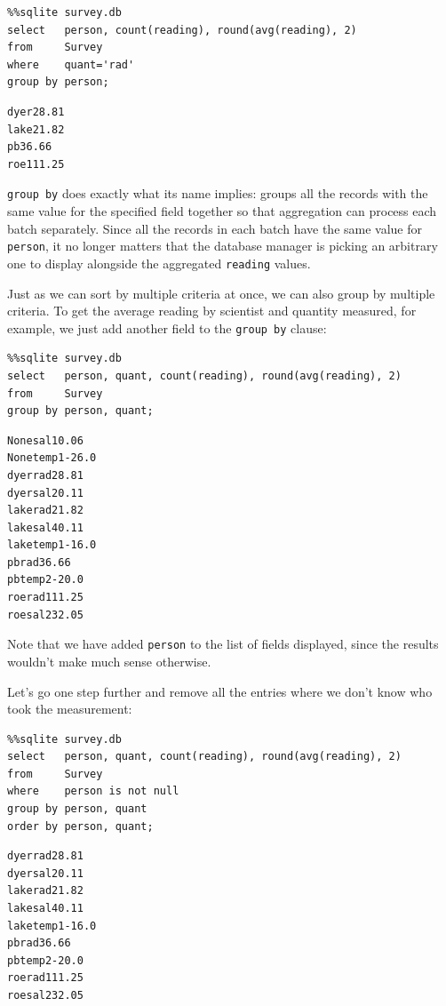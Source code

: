 \documentclass[]{book}
\begin{document}
\begin{verbatim}
%%sqlite survey.db
select   person, count(reading), round(avg(reading), 2)
from     Survey
where    quant='rad'
group by person;
\end{verbatim}

\begin{verbatim}
dyer28.81
lake21.82
pb36.66
roe111.25
\end{verbatim}

\texttt{group by} does exactly what its name implies: groups all the
records with the same value for the specified field together so that
aggregation can process each batch separately. Since all the records in
each batch have the same value for \texttt{person}, it no longer matters
that the database manager is picking an arbitrary one to display
alongside the aggregated \texttt{reading} values.

Just as we can sort by multiple criteria at once, we can also group by
multiple criteria. To get the average reading by scientist and quantity
measured, for example, we just add another field to the
\texttt{group by} clause:

\begin{verbatim}
%%sqlite survey.db
select   person, quant, count(reading), round(avg(reading), 2)
from     Survey
group by person, quant;
\end{verbatim}

\begin{verbatim}
Nonesal10.06
Nonetemp1-26.0
dyerrad28.81
dyersal20.11
lakerad21.82
lakesal40.11
laketemp1-16.0
pbrad36.66
pbtemp2-20.0
roerad111.25
roesal232.05
\end{verbatim}

Note that we have added \texttt{person} to the list of fields displayed,
since the results wouldn't make much sense otherwise.

Let's go one step further and remove all the entries where we don't know
who took the measurement:

\begin{verbatim}
%%sqlite survey.db
select   person, quant, count(reading), round(avg(reading), 2)
from     Survey
where    person is not null
group by person, quant
order by person, quant;
\end{verbatim}

\begin{verbatim}
dyerrad28.81
dyersal20.11
lakerad21.82
lakesal40.11
laketemp1-16.0
pbrad36.66
pbtemp2-20.0
roerad111.25
roesal232.05
\end{verbatim}
\end{document}
